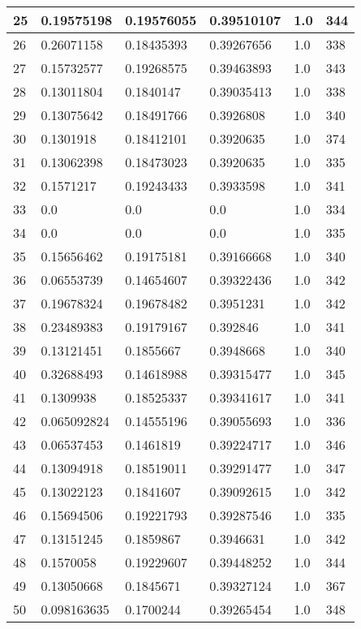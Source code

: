 \begin{longtable}{|l|l|l|l|l|l|}
25 & 0.19575198 & 0.19576055 & 0.39510107 & 1.0 & 344 \\ \hline 
26 & 0.26071158 & 0.18435393 & 0.39267656 & 1.0 & 338 \\ \hline 
27 & 0.15732577 & 0.19268575 & 0.39463893 & 1.0 & 343 \\ \hline 
28 & 0.13011804 & 0.1840147 & 0.39035413 & 1.0 & 338 \\ \hline 
29 & 0.13075642 & 0.18491766 & 0.3926808 & 1.0 & 340 \\ \hline 
30 & 0.1301918 & 0.18412101 & 0.3920635 & 1.0 & 374 \\ \hline 
31 & 0.13062398 & 0.18473023 & 0.3920635 & 1.0 & 335 \\ \hline 
32 & 0.1571217 & 0.19243433 & 0.3933598 & 1.0 & 341 \\ \hline 
33 & 0.0 & 0.0 & 0.0 & 1.0 & 334 \\ \hline 
34 & 0.0 & 0.0 & 0.0 & 1.0 & 335 \\ \hline 
35 & 0.15656462 & 0.19175181 & 0.39166668 & 1.0 & 340 \\ \hline 
36 & 0.06553739 & 0.14654607 & 0.39322436 & 1.0 & 342 \\ \hline 
37 & 0.19678324 & 0.19678482 & 0.3951231 & 1.0 & 342 \\ \hline 
38 & 0.23489383 & 0.19179167 & 0.392846 & 1.0 & 341 \\ \hline 
39 & 0.13121451 & 0.1855667 & 0.3948668 & 1.0 & 340 \\ \hline 
40 & 0.32688493 & 0.14618988 & 0.39315477 & 1.0 & 345 \\ \hline 
41 & 0.1309938 & 0.18525337 & 0.39341617 & 1.0 & 341 \\ \hline 
42 & 0.065092824 & 0.14555196 & 0.39055693 & 1.0 & 336 \\ \hline 
43 & 0.06537453 & 0.1461819 & 0.39224717 & 1.0 & 346 \\ \hline 
44 & 0.13094918 & 0.18519011 & 0.39291477 & 1.0 & 347 \\ \hline 
45 & 0.13022123 & 0.1841607 & 0.39092615 & 1.0 & 342 \\ \hline 
46 & 0.15694506 & 0.19221793 & 0.39287546 & 1.0 & 335 \\ \hline 
47 & 0.13151245 & 0.1859867 & 0.3946631 & 1.0 & 342 \\ \hline 
48 & 0.1570058 & 0.19229607 & 0.39448252 & 1.0 & 344 \\ \hline 
49 & 0.13050668 & 0.1845671 & 0.39327124 & 1.0 & 367 \\ \hline 
50 & 0.098163635 & 0.1700244 & 0.39265454 & 1.0 & 348 \\ \hline 
\end{longtable}